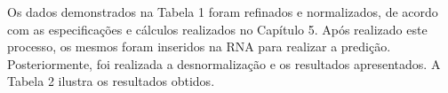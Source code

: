 Os dados demonstrados na Tabela 1 foram refinados e normalizados, de acordo com as especificações e cálculos realizados no Capítulo 5. Após realizado este processo, os mesmos foram inseridos na RNA para realizar a predição. Posteriormente, foi realizada a desnormalização e os resultados apresentados. A Tabela 2 ilustra os resultados obtidos.





